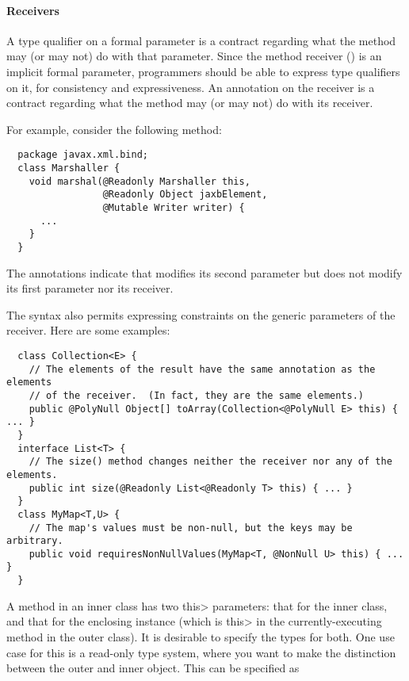\documentclass[10pt]{article}
\begin{document}
\paragraph{Receivers\label{receivers}}
A type qualifier on a formal parameter is a contract regarding what the
method may (or may not) do with that parameter.  Since the method receiver
() is an implicit formal parameter, programmers should be able
to express type qualifiers on it, for consistency and expressiveness.  An
annotation on the receiver is a contract regarding what the method may
(or may not) do with its receiver.



For example, consider the following method:

\preverbnegspace
\begin{Verbatim}
  package javax.xml.bind;
  class Marshaller {
    void marshal(@Readonly Marshaller this,
                 @Readonly Object jaxbElement,
                 @Mutable Writer writer) {
      ...
    }
  }
\end{Verbatim}

\noindent
The annotations indicate that  modifies its second parameter
but does not modify its first parameter nor its receiver.

The syntax also permits expressing constraints on the
generic parameters of the receiver.  Here are some examples:

\preverbnegspace
\begin{Verbatim}
  class Collection<E> {
    // The elements of the result have the same annotation as the elements
    // of the receiver.  (In fact, they are the same elements.)
    public @PolyNull Object[] toArray(Collection<@PolyNull E> this) { ... }
  }
  interface List<T> {
    // The size() method changes neither the receiver nor any of the elements.
    public int size(@Readonly List<@Readonly T> this) { ... }
  }
  class MyMap<T,U> {
    // The map's values must be non-null, but the keys may be arbitrary.
    public void requiresNonNullValues(MyMap<T, @NonNull U> this) { ... }
  }
\end{Verbatim}

A method in an inner class has two \<this> parameters:  that for the inner
class, and that for the enclosing instance (which is \<this> in the currently-executing method in the outer class).  It
is desirable to specify the types for both.  
One use case for this is a read-only type system, where you want to
make the distinction between the outer and inner object.
This can be specified as
\end{document}
